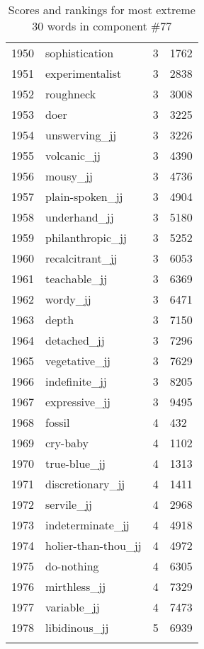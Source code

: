 \begin{longtable}[!htbp]{| rlr@{.}l |}
    1950 & sophistication & 3 & 1762 \\
    1951 & experimentalist & 3 & 2838 \\
    1952 & roughneck & 3 & 3008 \\
    1953 & doer & 3 & 3225 \\
    1954 & unswerving\_jj & 3 & 3226 \\
    1955 & volcanic\_jj & 3 & 4390 \\
    1956 & mousy\_jj & 3 & 4736 \\
    1957 & plain-spoken\_jj & 3 & 4904 \\
    1958 & underhand\_jj & 3 & 5180 \\
    1959 & philanthropic\_jj & 3 & 5252 \\
    1960 & recalcitrant\_jj & 3 & 6053 \\
    1961 & teachable\_jj & 3 & 6369 \\
    1962 & wordy\_jj & 3 & 6471 \\
    1963 & depth & 3 & 7150 \\
    1964 & detached\_jj & 3 & 7296 \\
    1965 & vegetative\_jj & 3 & 7629 \\
    1966 & indefinite\_jj & 3 & 8205 \\
    1967 & expressive\_jj & 3 & 9495 \\
    1968 & fossil & 4 & 432 \\
    1969 & cry-baby & 4 & 1102 \\
    1970 & true-blue\_jj & 4 & 1313 \\
    1971 & discretionary\_jj & 4 & 1411 \\
    1972 & servile\_jj & 4 & 2968 \\
    1973 & indeterminate\_jj & 4 & 4918 \\
    1974 & holier-than-thou\_jj & 4 & 4972 \\
    1975 & do-nothing & 4 & 6305 \\
    1976 & mirthless\_jj & 4 & 7329 \\
    1977 & variable\_jj & 4 & 7473 \\
    1978 & libidinous\_jj & 5 & 6939 \\
    \hline
    \caption{Scores and rankings for most extreme 30 words in component \#77} \\
\end{longtable}
